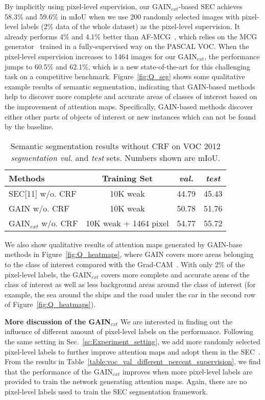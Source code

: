 \documentclass[10pt,twocolumn,letterpaper]{article}
\begin{document}
By implicitly using pixel-level supervision, our GAIN$_{ext}$-based SEC achieves 58.3\% and 59.6\% in mIoU when we use 200 randomly selected images with pixel-level labels (2\% data of the whole dataset) as the pixel-level supervision. It already performs 4\% and 4.1\% better than AF-MCG~\cite{zhou2016learning}, which relies on the MCG generator~\cite{arbelaez2014multiscale} trained in a fully-supervised way on the PASCAL VOC. When the pixel-level supervision increases to 1464 images for our GAIN$_{ext}$, the performance jumps to 60.5\% and 62.1\%, which is a new state-of-the-art for this challenging task on a competitive benchmark. Figure~\ref{fig:Q_seg} shows some qualitative example results of semantic segmentation, indicating that GAIN-based methods help to discover more complete and accurate areas of classes of interest based on the improvement of attention maps. Specifically, GAIN-based methods discover either other parts of objects of interest or new instances which can not be found by the baseline.

\begin{table}
 \centering
 \begin{tabular}{lccc}
 \hline
 Methods & Training Set & \emph{val.}  &  \emph{test}\\
 \hline
 SEC[11] w/o. CRF & 10K weak & 44.79 & 45.43\\
 GAIN w/o. CRF & 10K weak  & 50.78 & 51.76\\
 GAIN$_{ext}$ w/o. CRF & 10K weak + 1464 pixel & 54.77 & 55.72\\
 \hline
 \end{tabular}
 \caption{Semantic segmentation results without CRF on VOC 2012 \textit{segmentation val.} and \textit{test} sets. Numbers shown are mIoU.}
 \label{table:voc_ablation_results}
 \end{table}

We also show qualitative results of attention maps generated by GAIN-base methods in Figure~\ref{fig:Q_heatmaps}, where GAIN covers more areas belonging to the class of interest compared with the Grad-CAM~\cite{grad-cam}. With only 2\% of the pixel-level labels, the GAIN$_{ext}$ covers more complete and accurate areas of the class of interest as well as less background areas around the class of interest (for example, the sea around the ships and the road under the car in the second row of Figure~\ref{fig:Q_heatmaps}).



\textbf{More discussion of the GAIN$_{ext}$} We are interested in finding out the influence of different amount of pixel-level labels on the performance. Following the same setting in Sec.~\ref{sc:Experiment_setting}, we add more randomly selected pixel-level labels to further improve attention maps and adopt them in the SEC~\cite{kolesnikov2016seed}. From the results in Table~\ref{table:voc_val_different_percent_supervision}, we find that the performance of the GAIN$_{ext}$ improves when more pixel-level labels are provided to train the network generating attention maps. Again, there are no pixel-level labels used to train the SEC segmentation framework.
\end{document}
